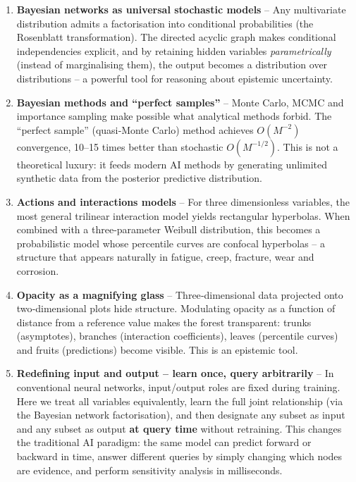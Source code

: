 \begin{enumerate}
    \item \textbf{Bayesian networks as universal stochastic models} – Any multivariate distribution admits a factorisation into conditional probabilities (the Rosenblatt transformation). The directed acyclic graph makes conditional independencies explicit, and by retaining hidden variables \emph{parametrically} (instead of marginalising them), the output becomes a distribution over distributions – a powerful tool for reasoning about epistemic uncertainty.

    \item \textbf{Bayesian methods and “perfect samples”} – Monte Carlo, MCMC and importance sampling make possible what analytical methods forbid. The “perfect sample” (quasi‑Monte Carlo) method achieves \(O(M^{-2})\) convergence, 10–15 times better than stochastic \(O(M^{-1/2})\). This is not a theoretical luxury: it feeds modern AI methods by generating unlimited synthetic data from the posterior predictive distribution.

    \item \textbf{Actions and interactions models} – For three dimensionless variables, the most general trilinear interaction model yields rectangular hyperbolas. When combined with a three‑parameter Weibull distribution, this becomes a probabilistic model whose percentile curves are confocal hyperbolas – a structure that appears naturally in fatigue, creep, fracture, wear and corrosion.

    \item \textbf{Opacity as a magnifying glass} – Three‑dimensional data projected onto two‑dimensional plots hide structure. Modulating opacity as a function of distance from a reference value makes the forest transparent: trunks (asymptotes), branches (interaction coefficients), leaves (percentile curves) and fruits (predictions) become visible. This is an epistemic tool.

    \item \textbf{Redefining input and output – learn once, query arbitrarily} – In conventional neural networks, input/output roles are fixed during training. Here we treat all variables equivalently, learn the full joint relationship (via the Bayesian network factorisation), and then designate any subset as input and any subset as output \textbf{at query time} without retraining. This changes the traditional AI paradigm: the same model can predict forward or backward in time, answer different queries by simply changing which nodes are evidence, and perform sensitivity analysis in milliseconds.


\end{enumerate}
